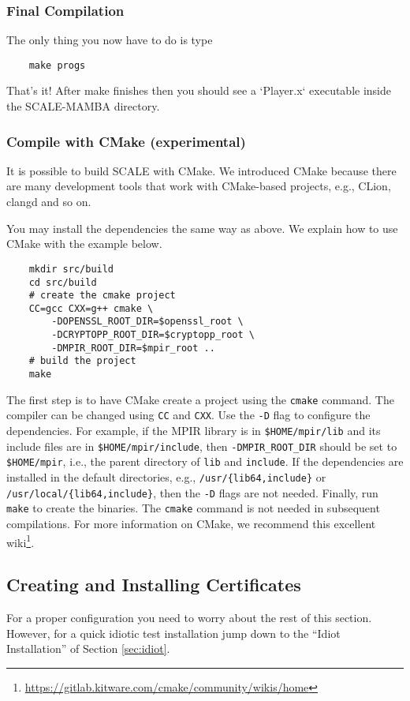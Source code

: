 \subsubsection{Final Compilation}
The only thing you now have to do is type
\begin{verbatim}
    make progs
\end{verbatim}
That's it! After make finishes then you should see a `Player.x`
executable inside the SCALE-MAMBA directory.

\subsubsection{Compile with CMake (experimental)}
It is possible to build SCALE with CMake.
We introduced CMake because there are many development tools that work with CMake-based projects,
e.g., CLion, clangd and so on.

You may install the dependencies the same way as above.
We explain how to use CMake with the example below.

\begin{verbatim}
    mkdir src/build
    cd src/build
    # create the cmake project
    CC=gcc CXX=g++ cmake \
        -DOPENSSL_ROOT_DIR=$openssl_root \
        -DCRYPTOPP_ROOT_DIR=$cryptopp_root \
        -DMPIR_ROOT_DIR=$mpir_root ..
    # build the project
    make
\end{verbatim}

The first step is to have CMake create a project using the \verb+cmake+ command.
The compiler can be changed using \verb+CC+ and \verb+CXX+.
Use the \verb+-D+ flag to configure the dependencies.
For example, if the MPIR library is in \verb+$HOME/mpir/lib+ and its include files are in \verb+$HOME/mpir/include+,
then \verb+-DMPIR_ROOT_DIR+ should be set to \verb+$HOME/mpir+, i.e., the parent directory of \verb+lib+ and \verb+include+.
If the dependencies are installed in the default directories,
e.g., \verb+/usr/{lib64,include}+ or \verb+/usr/local/{lib64,include}+,
then the \verb+-D+ flags are not needed.
Finally, run \verb+make+ to create the binaries.
The \verb+cmake+ command is not needed in subsequent compilations.
For more information on CMake, we recommend this excellent wiki\footnote{\url{https://gitlab.kitware.com/cmake/community/wikis/home}}.


\subsection{Creating and Installing Certificates}
For a proper configuration you need to worry about the rest
of this section. 
However, for a quick idiotic test installation jump down to the ``Idiot 
Installation'' of Section \ref{sec:idiot}.

